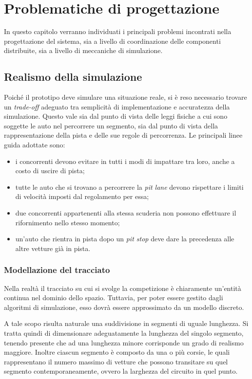\chapter{Problematiche di progettazione}
\label{ch:problematiche}

In questo capitolo verranno individuati i principali problemi incontrati nella progettazione del sistema, sia a livello di coordinazione delle componenti distribuite, sia a livello di meccaniche di simulazione.

\section{Realismo della simulazione}
Poiché il prototipo deve simulare una situazione reale, si è reso necessario trovare un \textit{trade-off} adeguato tra semplicità di implementazione e accuratezza della simulazione. Questo vale sia dal punto di vista delle leggi fisiche a cui sono soggette le auto nel percorrere un segmento, sia dal punto di vista della rappresentazione della pista e delle sue regole di percorrenza. Le principali linee guida adottate sono:
\begin{itemize}
\item i concorrenti devono evitare in tutti i modi di impattare tra loro, anche a costo di uscire di pista;
\item tutte le auto che si trovano a percorrere la \textit{pit lane} devono rispettare i limiti di velocità imposti dal regolamento per essa;
\item due concorrenti appartenenti alla stessa scuderia non possono effettuare il rifornimento nello stesso momento;
\item un'auto che rientra in pista dopo un \textit{pit stop} deve dare la precedenza alle altre vetture già in pista.
\end{itemize}

\subsection*{Modellazione del tracciato}
Nella realtà il tracciato su cui si svolge la competizione è chiaramente un'entità continua nel dominio dello spazio. Tuttavia, per poter essere gestito dagli algoritmi di simulazione, esso dovrà essere approssimato da un modello discreto.

A tale scopo risulta naturale una suddivisione in segmenti di uguale lunghezza. Si tratta quindi di dimensionare adeguatamente la lunghezza del singolo segmento, tenendo presente che ad una lunghezza minore corrisponde un grado di realismo maggiore. Inoltre ciascun segmento è composto da una o più corsie, le quali rappresentano il numero massimo di vetture che possono transitare su quel segmento contemporaneamente, ovvero la larghezza del circuito in quel punto.

